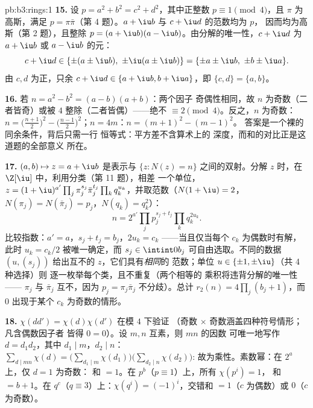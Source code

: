 \begin{solution}{pb:b3:rings:1}
\textbf{15.} 设 $p = a^2 + b^2 = c^2 + d^2$，其中正整数
$p \equiv 1 \pmod 4$，且 $\pi$ 为高斯，满足
$p = \pi\bar\pi$（第 4 题）。$a + \iu b$ 与 $c + \iu d$ 的范数均为 $p$，
因而均为高斯（第 2 题），且整除
$p = (a+\iu b)(a - \iu b)$。由分解的唯一性，$c +
\iu d$ 为 $a + \iu b$ 或 $a - \iu b$ 的元：
\[
c + \iu d \in \{\pm(a \pm \iu b),\ \pm\iu(a \pm \iu b)\}
= \{\pm a \pm \iu b,\ \pm b \pm \iu a\}.
\]
由 $c, d$ 为正，只余 $c + \iu d \in \{a + \iu b, b + \iu
a\}$，即 $\{c, d\} = \{a, b\}$。

\textbf{16.} 若 $n = a^2 - b^2 = (a-b)(a+b)$：两个因子
奇偶性相同，故 $n$ 为奇数（二者皆奇）或被
$4$ 整除（二者皆偶）——绝不 $\equiv 2 \pmod 4$。反之，$n$
为奇数：$n = \bigl(\frac{n+1}2\bigr)^2 -
\bigl(\frac{n-1}2\bigr)^2$；$n = 4m$：$n = (m+1)^2 - (m-1)^2$。
答案是一个裸的同余条件，背后只需一行
恒等式：平方差不含算术上的
深度，而和的对比正是这道题的全部意义
所在。

\textbf{17.} $(a, b) \mapsto z = a + \iu b$ 是表示与
$\{z : N(z) = n\}$ 之间的双射。分解 $z$ 时，在
 $\Z[\iu]$ 中，利用分类（第 11 题），相差
一个单位，$z = (1+\iu)^{a'}\prod_j\pi_j^{s_j}\bar\pi_j^{t_j}
\prod_kq_k^{u_k}$，并取范数（$N(1+\iu) = 2$，
$N(\pi_j) = N(\bar\pi_j) = p_j$，$N(q_k) = q_k^2$）：
\[
n = 2^{a'}\prod_jp_j^{s_j + t_j}\prod_kq_k^{2u_k} .
\]
比较指数：$a' = a$，$s_j + t_j = b_j$，$2u_k = c_k$
——当且仅当每个 $c_k$ 为偶数时有解，此时 $u_k = c_k/2$
被唯一确定，而 $s_j \in \intint0{b_j}$ 可自由选取。不同的数据
$(u, (s_j))$ 给出互不的 $z$，它们具有\emph{相同}的
范数；单位 $u \in \{\pm1, \pm\iu\}$（共 4 种选择）则
逐一枚举每个类，且不重复（两个相等的
乘积将违背分解的唯一性——
$\pi_j$ 与 $\bar\pi_j$ 互不，因为 $p_j =
\pi_j\bar\pi_j$ 不分歧）。总计 $r_2(n) =
4\prod_j(b_j + 1)$，而 $0$ 出现于某个 $c_k$ 为奇数的情形。

\textbf{18.} $\chi(dd') = \chi(d)\chi(d')$ 在模 $4$ 下验证
（奇数 $\times$ 奇数涵盖四种符号情形；凡含偶数因子者
皆得 $0 = 0$）。设 $m, n$ 互素，则 $mn$ 的因数
可唯一地写作 $d = d_1d_2$，其中 $d_1 \mid m$，$d_2 \mid n$：
$\sum_{d \mid mn}\chi(d) = \bigl(\sum_{d_1\mid
m}\chi(d_1)\bigr)\bigl(\sum_{d_2\mid n}\chi(d_2)\bigr)$:
故为乘性。素数幂：在 $2^a$ 上，仅 $d = 1$ 为奇数：
和 $= 1$。在 $p^b$（$p \equiv 1$）上，所有 $\chi(p^i) = 1$，
和 $= b + 1$。在 $q^c$（$q \equiv 3$）上：$\chi(q^i) =
(-1)^i$，交错和 $= 1$（$c$ 为偶数）或 $0$（$c$ 为奇数）。


\end{solution}
